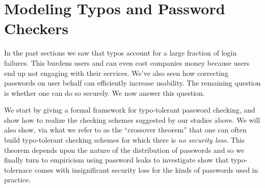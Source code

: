 \section{Modeling Typos and Password Checkers}
\label{sec:formal}


In the past sections we saw that typos account for a large fraction of login
failures. This burdens users and can even cost companies money because users end
up not engaging with their services. We've also seen how correcting passwords on
user behalf can efficiently increase usability. The remaining question is
whether one can do so securely. We now answer this question. 

We start by giving a formal framework for typo-tolerant password checking, and
show how to realize the checking schemes suggested by our studies above. We
will also show, via what we refer to as the ``crossover theorem'' that one can
often build typo-tolerant checking schemes for which there is \emph{no security
loss}. This theorem depends upon the nature of the distribution of passwords 
and so we finally turn to empiricism using password leaks to investigate show
that typo-tolernace comes with insignificant security loss for the kinds of 
passwords used in practice.



\iffalse
A distance measure $\dist$ is a function
$\dist\Colon\PW\times\PW\rightarrow\R^+$.  We will often denote
$\dist(\pw,\pwtypo)$ by $\dist_\pw(\pwtypo)$.  The neighborhood of
$\delta$-close points of a password $\pw \in \PW$ is the set
$\ball_{\dist,\delta}(\pw) = \{\pwtypo \;|\; \pwtypo \in \PW
\textnormal{ and } \dist_\pw(\pwtypo) \le \delta\}$.
When $\dist$ and $\delta$ are clear from context we will write simply
$\ball(\pw)$ and call this the ball centered at $\pw$.
\fi

